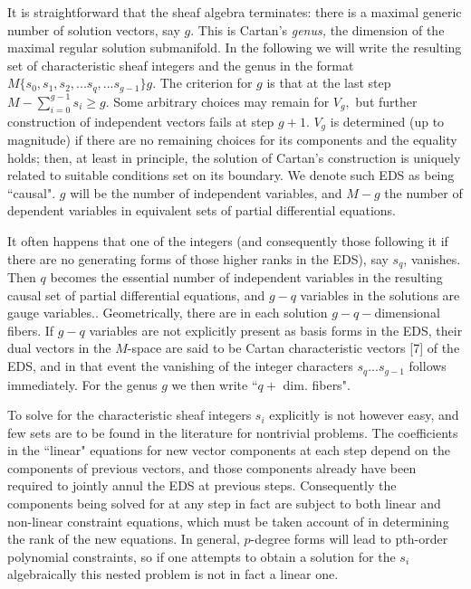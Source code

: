 \documentclass[a4paper,a4paper]{article}
\begin{document}
        It is straightforward \cite{est89} that the sheaf algebra
terminates:  there is a maximal generic number of solution vectors,  say
$g$.  This is Cartan's {\itshape genus,  }the dimension of the maximal regular 
solution submanifold.  In the following we will write the resulting set of characteristic sheaf
integers and the genus in the format $M\{{s_0}, {s_1}, {s_2}, ...{s_q},
...{s_{g-1}}\} g$.  The criterion for $g$ is that at the last step $M -
\sum _{i=0}^{g-1}{s_i} \geqslant g$.  Some arbitrary choices may
remain for \({V_g}, \) but further construction of independent
vectors fails at step $g + 1$.  ${V_g}$ is determined  (up to magnitude)
if there are no remaining choices for its components and the equality
holds; then,  at least in principle,  the solution of Cartan's construction is
uniquely related to suitable conditions set on its boundary.  We denote
such EDS as being ``causal".   $g$ will be the number of independent variables,
and $M-g$ the number of dependent variables in equivalent sets of
partial differential equations.

        It often happens that one of the integers (and consequently
those following it if there are no generating forms of those higher
ranks in the EDS), say ${s_q}$,  vanishes.  Then $q$ becomes the essential number of
independent variables in the resulting causal set of partial
differential equations, and $g-q$ variables in the solutions are gauge variables..
Geometrically,   there are in each solution $g-q-$dimensional fibers.
If $g-q$ variables are not explicitly present as basis forms in the EDS, their dual vectors
in the $M$-space are said to be Cartan characteristic vectors [7] of the
EDS,
and in that event the vanishing of the integer characters
${s_q}...{s_{g-1}}$ follows immediately.   For the genus $g$ we then
write ``$q +$ dim. fibers".

        To solve for the characteristic sheaf integers ${s_{i }}$
explicitly is not however easy,  and few sets are to be found in the
literature for nontrivial problems.  The coefficients in the ``linear" equations
for new vector components at each step depend on the components of
previous vectors,  and those components already have been required to jointly
annul the EDS at previous steps.  Consequently the components being
solved for at any step in fact are subject to both linear and non-linear constraint
equations,  which must be taken account of in determining the rank of
the new equations.  In general,  $p$-degree forms will lead to pth-order
polynomial constraints,  so if one attempts to obtain a solution for the
${s_i}$ algebraically this nested problem is not in fact a linear one.
\end{document}
